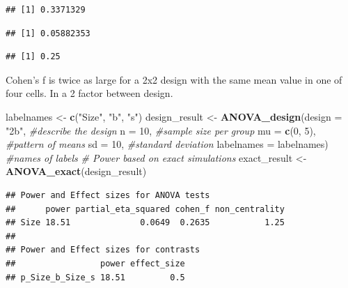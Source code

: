 \documentclass[]{book}
\newenvironment{Shaded}{\begin{snugshade}}{\end{snugshade}}
\newcommand{\CommentTok}[1]{\textcolor[rgb]{0.56,0.35,0.01}{\textit{#1}}}
\newcommand{\DataTypeTok}[1]{\textcolor[rgb]{0.13,0.29,0.53}{#1}}
\newcommand{\DecValTok}[1]{\textcolor[rgb]{0.00,0.00,0.81}{#1}}
\newcommand{\KeywordTok}[1]{\textcolor[rgb]{0.13,0.29,0.53}{\textbf{#1}}}
\newcommand{\NormalTok}[1]{#1}
\newcommand{\OperatorTok}[1]{\textcolor[rgb]{0.81,0.36,0.00}{\textbf{#1}}}
\newcommand{\StringTok}[1]{\textcolor[rgb]{0.31,0.60,0.02}{#1}}
\begin{document}
\begin{verbatim}
## [1] 0.3371329
\end{verbatim}

\begin{Shaded}
\end{Shaded}

\begin{verbatim}
## [1] 0.05882353
\end{verbatim}

\begin{Shaded}
\end{Shaded}

\begin{verbatim}
## [1] 0.25
\end{verbatim}

Cohen's f is twice as large for a 2x2 design with the same mean value in one of four cells. In a 2 factor between design.

\begin{Shaded}
\begin{Highlighting}[]
\NormalTok{labelnames <-}\StringTok{ }\KeywordTok{c}\NormalTok{(}\StringTok{"Size"}\NormalTok{, }\StringTok{"b"}\NormalTok{, }\StringTok{"s"}\NormalTok{)}
\NormalTok{design_result <-}\StringTok{ }\KeywordTok{ANOVA_design}\NormalTok{(}\DataTypeTok{design =} \StringTok{"2b"}\NormalTok{, }\CommentTok{#describe the design}
                              \DataTypeTok{n =} \DecValTok{10}\NormalTok{, }\CommentTok{#sample size per group }
                              \DataTypeTok{mu =} \KeywordTok{c}\NormalTok{(}\DecValTok{0}\NormalTok{, }\DecValTok{5}\NormalTok{), }\CommentTok{#pattern of means}
                              \DataTypeTok{sd =} \DecValTok{10}\NormalTok{, }\CommentTok{#standard deviation}
                              \DataTypeTok{labelnames =}\NormalTok{ labelnames) }\CommentTok{#names of labels}
\CommentTok{# Power based on exact simulations}
\NormalTok{exact_result <-}\StringTok{ }\KeywordTok{ANOVA_exact}\NormalTok{(design_result)}
\end{Highlighting}
\end{Shaded}

\begin{verbatim}
## Power and Effect sizes for ANOVA tests
##      power partial_eta_squared cohen_f non_centrality
## Size 18.51              0.0649  0.2635           1.25
## 
## Power and Effect sizes for contrasts
##                 power effect_size
## p_Size_b_Size_s 18.51         0.5
\end{verbatim}
\end{document}

